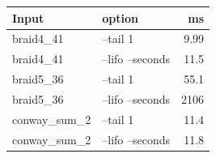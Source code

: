 \begin{tabular}{@{}llr@{}}
\toprule
Input & option & ms \\
\midrule
braid4\_41 & --tail 1 & 9.99 \\
braid4\_41 & --lifo --seconds & 11.5 \\
braid5\_36 & --tail 1 & 55.1 \\
braid5\_36 & --lifo --seconds & 2106 \\
conway\_sum\_2 & --tail 1 & 11.4 \\
conway\_sum\_2 & --lifo --seconds & 11.8 \\
\bottomrule
\end{tabular}
